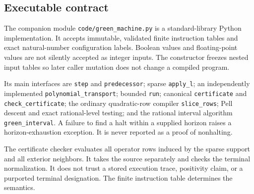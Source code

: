 \documentclass[11pt,letterpaper]{article}
\theoremstyle{definition}
\theoremstyle{remark}
\begin{document}
\subsection{Executable contract}
The companion module \texttt{code/green\_machine.py} is a standard-library
Python implementation. It accepts immutable, validated finite instruction
tables and exact natural-number configuration labels. Boolean values and
floating-point values are not silently accepted as integer inputs.
The constructor freezes nested input tables so later caller mutation does
not change a compiled program.

Its main interfaces are \texttt{step} and \texttt{predecessor}; sparse
\texttt{apply\_l}; an independently implemented
\texttt{polynomial\_transport}; bounded \texttt{run}; canonical
\texttt{certificate} and \texttt{check\_certificate}; the ordinary
quadratic-row compiler \texttt{slice\_rows}; Pell descent and exact
rational-level testing; and the rational interval algorithm
\texttt{green\_interval}. A failure to find a halt within a supplied
horizon raises a horizon-exhaustion exception. It is never reported as a
proof of nonhalting.

The certificate checker evaluates all operator rows induced by the sparse
support and all exterior neighbors. It takes the source separately and
checks the terminal normalization. It does not trust a stored execution
trace, positivity claim, or a purported terminal designation. The finite
instruction table determines the semantics.
\end{document}
